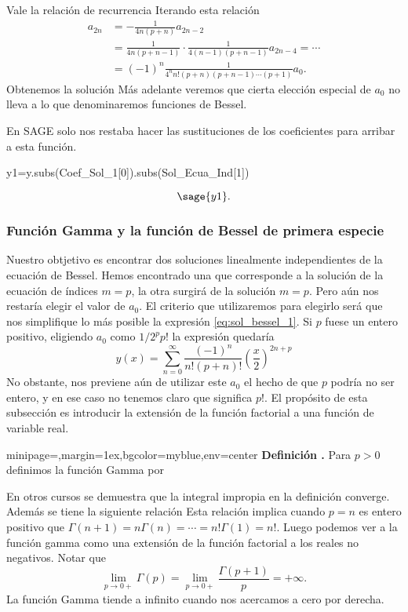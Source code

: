 \documentclass{article}
\newenvironment{colbox}[2]{%
    \begin{adjustbox}{minipage={\linewidth},margin=1ex,bgcolor=#1,env=center}
        #2}{%
    \end{adjustbox}%
}
\newcounter{defi_cont}
\newenvironment{definicion}[1]{\begin{colbox}{myblue}{\refstepcounter{defi_cont}\textbf{Definición \arabic{defi_cont}.} #1}}{\end{colbox}}
\newcounter{cor_cont}
\renewcommand{\emph}[1]{\textcolor[rgb]{0,0,1}{#1}}
\begin{document}
Vale la relación de recurrencia
Iterando esta relación
\[
\begin{split}
  a_{2n}&=-\frac{1}{4n(p+n)}a_{2n-2}\\
       &=\frac{1}{4n(p+n-1)}\cdot\frac{1}{4(n-1)(p+n-1)}a_{2n-4}=\cdots\\
       & =(-1)^n\frac{1}{4^nn!(p+n)(p+n-1)\cdots (p+1)}a_{0}.
\end{split}
\]
Obtenemos la solución 
Más adelante veremos que cierta elección especial de $a_0$ no lleva a lo que denominaremos funciones de Bessel.

En SAGE solo nos restaba hacer las sustituciones de los coeficientes para arribar a esta función.
\begin{sageblock}
y1=y.subs(Coef_Sol_1[0]).subs(Sol_Ecua_Ind[1])
\end{sageblock}

\[\sage{y1}.\]

\subsubsection{Función Gamma y la función de Bessel de primera especie}

Nuestro obtjetivo es encontrar dos soluciones linealmente independientes de la ecuación de Bessel. Hemos encontrado una que corresponde a la solución de la ecuación de índices $m=p$, la otra surgirá de la solución $m=p$. Pero aún nos restaría elegir el valor de $a_0$. El criterio que utilizaremos para elegirlo será que nos simplifique lo más posible la expresión  \eqref{eq:sol_bessel_1}. Si $p$ fuese un entero positivo, eligiendo $a_0$ como $1/2^pp!$ la expresión quedaría
\[y(x)=\sum_{n=0}^{\infty}\frac{(-1)^n}{n!(p+n)!}\left(\frac{x}{2}\right)^{2n+p}\]
No obstante, nos previene aún de utilizar este $a_0$ el hecho de que $p$ podría no ser entero, y en ese caso no tenemos claro que significa $p!$. El propósito de esta subsección es introducir la extensión de la función factorial a una función de variable real. 

\begin{definicion}\label{def:gamma} Para $p>0$ definimos la \emph{función Gamma} por 
\end{definicion}

En otros cursos se demuestra que la integral impropia en la definición converge. Además se tiene la siguiente relación
Esta relación implica cuando $p=n$ es entero positivo que $\Gamma(n+1)=n\Gamma(n)=\cdots=n!\Gamma(1)=n!$. Luego podemos ver a la función gamma como una extensión de la función factorial a los reales no negativos. Notar que
\[\lim_{p\to 0+}\Gamma(p)=\lim_{p\to 0+}\frac{\Gamma(p+1)}{p}=+\infty.\]
La función Gamma tiende a  infinito cuando nos acercamos a cero por derecha.
\end{document}
